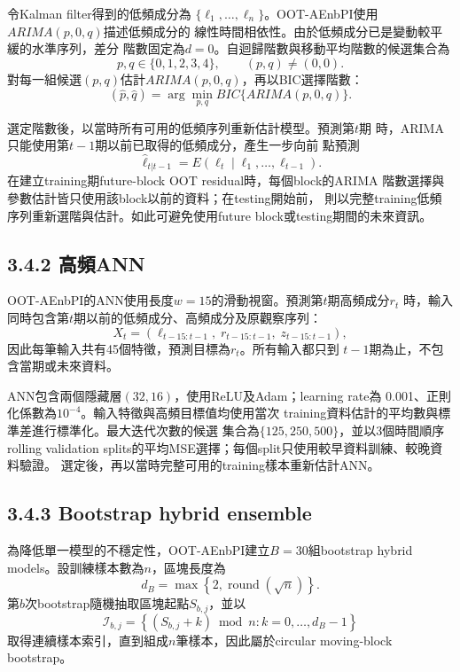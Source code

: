 令Kalman filter得到的低頻成分為
$\{\ell_1,\ldots,\ell_n\}$。OOT-AEnbPI使用$ARIMA(p,0,q)$描述低頻成分的
線性時間相依性。由於低頻成分已是變動較平緩的水準序列，差分
階數固定為$d=0$。自迴歸階數與移動平均階數的候選集合為
\[
p,q\in\{0,1,2,3,4\},\qquad (p,q)\neq(0,0).
\]
對每一組候選$(p,q)$估計$ARIMA(p,0,q)$，再以BIC選擇階數：
\[
(\widehat p,\widehat q)
=
\arg\min_{p,q}
BIC\{ARIMA(p,0,q)\}.
\]

選定階數後，以當時所有可用的低頻序列重新估計模型。預測第$t$期
時，ARIMA只能使用第$t-1$期以前已取得的低頻成分，產生一步向前
點預測
\[
\widehat\ell_{t|t-1}
=
E(\ell_t\mid\ell_1,\ldots,\ell_{t-1}).
\]
在建立training期future-block OOT residual時，每個block的ARIMA
階數選擇與參數估計皆只使用該block以前的資料；在testing開始前，
則以完整training低頻序列重新選階與估計。如此可避免使用future
block或testing期間的未來資訊。

\subsection*{3.4.2 高頻ANN}

OOT-AEnbPI的ANN使用長度$w=15$的滑動視窗。預測第$t$期高頻成分$r_t$
時，輸入同時包含第$t$期以前的低頻成分、高頻成分及原觀察序列：
\begin{equation}
 X_t=\left(
 \ell_{t-15:t-1},\;r_{t-15:t-1},\;z_{t-15:t-1}
 \right),
\end{equation}
因此每筆輸入共有45個特徵，預測目標為$r_t$。所有輸入都只到
$t-1$期為止，不包含當期或未來資料。

ANN包含兩個隱藏層$(32,16)$，使用ReLU及Adam；learning rate為
0.001、正則化係數為$10^{-4}$。輸入特徵與高頻目標值均使用當次
training資料估計的平均數與標準差進行標準化。最大迭代次數的候選
集合為$\{125,250,500\}$，並以3個時間順序rolling validation
splits的平均MSE選擇；每個split只使用較早資料訓練、較晚資料驗證。
選定後，再以當時完整可用的training樣本重新估計ANN。

\subsection*{3.4.3 Bootstrap hybrid ensemble}

為降低單一模型的不穩定性，OOT-AEnbPI建立$B=30$組bootstrap hybrid
models。設訓練樣本數為$n$，區塊長度為
\begin{equation}
 d_B=\max\left\{2,\operatorname{round}(\sqrt n)\right\}.
\end{equation}
第$b$次bootstrap隨機抽取區塊起點$S_{b,j}$，並以
\begin{equation}
 \mathcal I_{b,j}=\left\{(S_{b,j}+k)\bmod n:
 k=0,\ldots,d_B-1\right\}
\end{equation}
取得連續樣本索引，直到組成$n$筆樣本，因此屬於circular
moving-block bootstrap。

